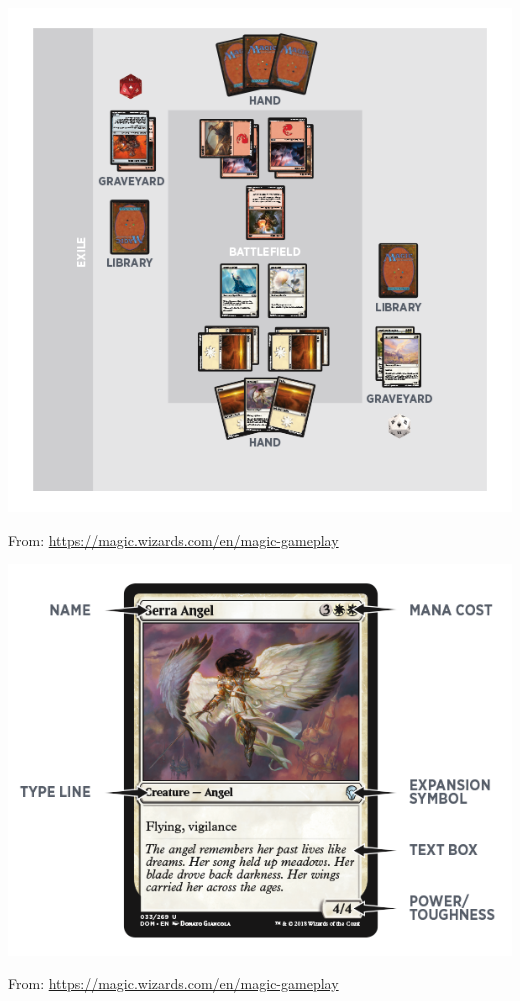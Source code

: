 \documentclass{beamer}
\begin{document}
    \begin{frame}
        \begin{center}
            \includegraphics[width=.8\textwidth]{./img/magic_battlefield/main.png}
        \end{center}
        \tiny{From: \url{https://magic.wizards.com/en/magic-gameplay}}
    \end{frame}

    \begin{frame}
        \begin{center}
            \includegraphics[height=.8\textwidth]{./img/serra_angel/main.png}
        \end{center}
        \tiny{From: \url{https://magic.wizards.com/en/magic-gameplay}}
    \end{frame}
\end{document}
